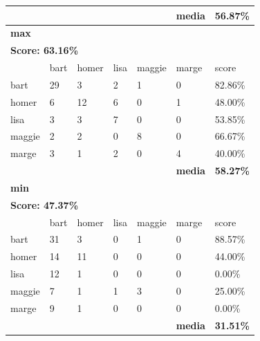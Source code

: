 \documentclass[paper=a4, fontsize=11pt]{scrartcl} %
\numberwithin{equation}{section} %
\numberwithin{figure}{section} %
\numberwithin{table}{section} %
\begin{document}
\begin{table}[]
\begin{tabular}{l|l|l|l|l|l|l}
\textbf{} & \textbf{} & \textbf{} & \textbf{} & \textbf{} & \textbf{media} & \textbf{56.87\%} \\ \hline
\multicolumn{7}{l}{\textbf{max}}                                                            \\ \hline
\multicolumn{7}{l}{\textbf{Score: 63.16\%}}                                                 \\ \hline
          & bart      & homer     & lisa      & maggie    & marge          & score            \\ \hline
bart      & 29        & 3         & 2         & 1         & 0              & 82.86\%          \\ \hline
homer     & 6         & 12        & 6         & 0         & 1              & 48.00\%          \\ \hline
lisa      & 3         & 3         & 7         & 0         & 0              & 53.85\%          \\ \hline
maggie    & 2         & 2         & 0         & 8         & 0              & 66.67\%          \\ \hline
marge     & 3         & 1         & 2         & 0         & 4              & 40.00\%          \\ \hline
\textbf{} & \textbf{} & \textbf{} & \textbf{} & \textbf{} & \textbf{media} & \textbf{58.27\%} \\ \hline
\multicolumn{7}{l}{\textbf{min}}                                                            \\ \hline
\multicolumn{7}{l}{\textbf{Score: 47.37\%}}                                                 \\ \hline
          & bart      & homer     & lisa      & maggie    & marge          & score            \\ \hline
bart      & 31        & 3         & 0         & 1         & 0              & 88.57\%          \\ \hline
homer     & 14        & 11        & 0         & 0         & 0              & 44.00\%          \\ \hline
lisa      & 12        & 1         & 0         & 0         & 0              & 0.00\%           \\ \hline
maggie    & 7         & 1         & 1         & 3         & 0              & 25.00\%          \\ \hline
marge     & 9         & 1         & 0         & 0         & 0              & 0.00\%           \\ \hline
\textbf{} & \textbf{} & \textbf{} & \textbf{} & \textbf{} & \textbf{media} & \textbf{31.51\%} \\ \hline

\end{tabular}
\end{table}
\end{document}
